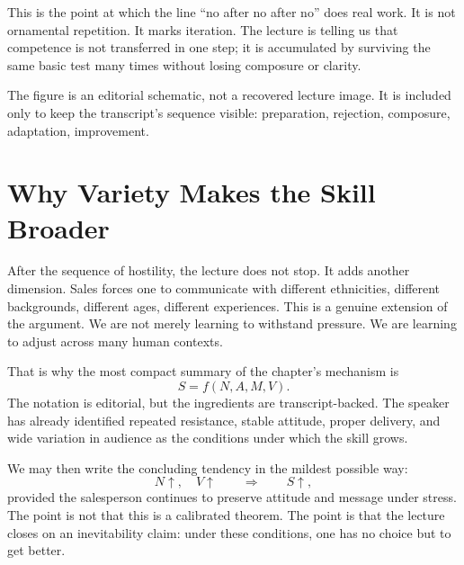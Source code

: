 This is the point at which the line ``no after no after no'' does real work. It is not ornamental repetition. It marks iteration. The lecture is telling us that competence is not transferred in one step; it is accumulated by surviving the same basic test many times without losing composure or clarity.

\begin{figure}[h]
\centering
{}
\end{figure}

The figure is an editorial schematic, not a recovered lecture image. It is included only to keep the transcript's sequence visible: preparation, rejection, composure, adaptation, improvement.

\section{Why Variety Makes the Skill Broader}

After the sequence of hostility, the lecture does not stop. It adds another dimension. Sales forces one to communicate with different ethnicities, different backgrounds, different ages, different experiences. This is a genuine extension of the argument. We are not merely learning to withstand pressure. We are learning to adjust across many human contexts.

That is why the most compact summary of the chapter's mechanism is
\begin{equation}
S = f(N,A,M,V).
\end{equation}
The notation is editorial, but the ingredients are transcript-backed. The speaker has already identified repeated resistance, stable attitude, proper delivery, and wide variation in audience as the conditions under which the skill grows.

We may then write the concluding tendency in the mildest possible way:
\begin{equation}
N \uparrow,\quad V \uparrow
\qquad \Longrightarrow \qquad
S \uparrow,
\end{equation}
provided the salesperson continues to preserve attitude and message under stress. The point is not that this is a calibrated theorem. The point is that the lecture closes on an inevitability claim: under these conditions, one has no choice but to get better.

